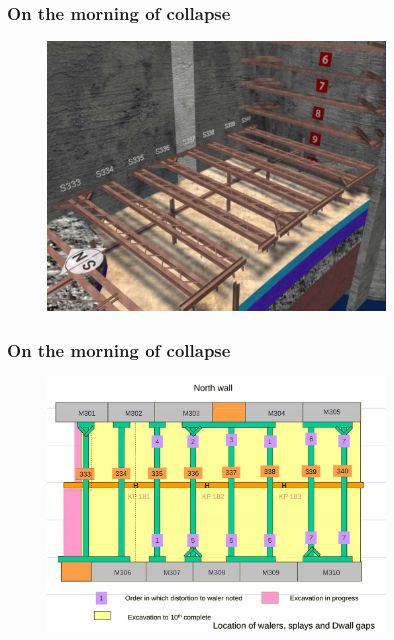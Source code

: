 \documentclass[notes]{beamer}
\begin{document}
\begin{frame}
\frametitle{On the morning of collapse}
\begin{figure}[ht]
	\centering
	\includegraphics[width=0.8\textwidth]{figs/observation-morning-collapse.png}
\end{figure}
\end{frame}

\begin{frame}
\frametitle{On the morning of collapse}
\begin{figure}[ht]
	\centering
	\includegraphics[width=0.8\textwidth]{figs/splays-dwall-gaps.png}
\end{figure}
\end{frame}
\end{document}
